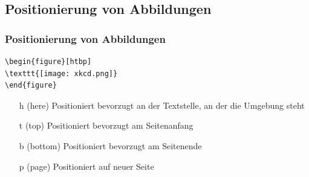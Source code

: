 \subsection{Positionierung von Abbildungen}
\begin{frame}[fragile]
\frametitle{Positionierung von Abbildungen}
  \begin{codeblock}
\begin{verbatim}
\begin{figure}[htbp]
\texttt{[image: xkcd.png]}
\end{figure}
\end{verbatim}
  \end{codeblock}
  \pause
  
  \begin{itemize}
    \item[h] (here) Positioniert bevorzugt an der Textstelle, an
        der die Umgebung steht\pause
    \item[t] (top) Positioniert bevorzugt am Seitenanfang\pause
    \item[b] (bottom) Positioniert bevorzugt am Seitenende\pause
    \item[p] (page) Positioniert auf neuer Seite
  \end{itemize}
\end{frame}